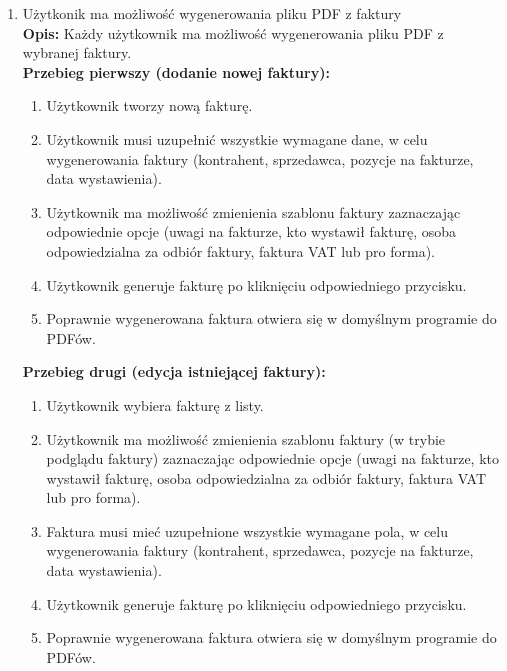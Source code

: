 \begin{enumerate}
    \item Użytkonik ma możliwość wygenerowania pliku PDF z faktury \\
    \textbf{Opis: } Każdy użytkownik ma możliwość wygenerowania pliku PDF z wybranej faktury. \\
    \textbf{Przebieg pierwszy (dodanie nowej faktury): }
    \begin{enumerate}
        \item Użytkownik tworzy nową fakturę.
        \item Użytkownik musi uzupełnić wszystkie wymagane dane, w celu wygenerowania faktury (kontrahent, sprzedawca, pozycje na fakturze, data wystawienia).
        \item Użytkownik ma możliwość zmienienia szablonu faktury zaznaczając odpowiednie opcje (uwagi na fakturze, kto wystawił fakturę, osoba odpowiedzialna za odbiór faktury, faktura VAT lub pro forma).
        \item Użytkownik generuje fakturę po kliknięciu odpowiedniego przycisku.
        \item Poprawnie wygenerowana faktura otwiera się w domyślnym programie do PDFów.
    \end{enumerate}
    \textbf{Przebieg drugi (edycja istniejącej faktury): }
    \begin{enumerate}
        \item Użytkownik wybiera fakturę z listy.
        \item Użytkownik ma możliwość zmienienia szablonu faktury (w trybie podglądu faktury) zaznaczając odpowiednie opcje (uwagi na fakturze, kto wystawił fakturę, osoba odpowiedzialna za odbiór faktury, faktura VAT lub pro forma).
        \item Faktura musi mieć uzupełnione wszystkie wymagane pola, w celu wygenerowania faktury (kontrahent, sprzedawca, pozycje na fakturze, data wystawienia).
        \item Użytkownik generuje fakturę po kliknięciu odpowiedniego przycisku.
        \item Poprawnie wygenerowana faktura otwiera się w domyślnym programie do PDFów.
    \end{enumerate}
\end{enumerate}

